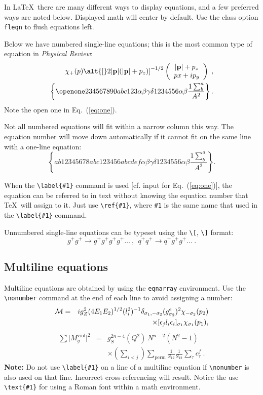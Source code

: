 \documentclass[%
 reprint,
 amsmath,amssymb,
 aps,
]{revtex4-2}
\begin{document}
In \LaTeX\ there are many different ways to display equations, and a
few preferred ways are noted below. Displayed math will center by
default. Use the class option \verb+fleqn+ to flush equations left.

Below we have numbered single-line equations; this is the most common
type of equation in \textit{Physical Review}:
\begin{eqnarray}
\chi_+(p)\alt{\bf [}2|{\bf p}|(|{\bf p}|+p_z){\bf ]}^{-1/2}
\left(
\begin{array}{c}
|{\bf p}|+p_z\\
px+ip_y
\end{array}\right)\;,
\\
\left\{%
 \openone234567890abc123\alpha\beta\gamma\delta1234556\alpha\beta
 \frac{1\sum^{a}_{b}}{A^2}%
\right\}%
\label{eq:one}.
\end{eqnarray}
Note the open one in Eq.~(\ref{eq:one}).

Not all numbered equations will fit within a narrow column this
way. The equation number will move down automatically if it cannot fit
on the same line with a one-line equation:
\begin{equation}
\left\{
 ab12345678abc123456abcdef\alpha\beta\gamma\delta1234556\alpha\beta
 \frac{1\sum^{a}_{b}}{A^2}%
\right\}.
\end{equation}

When the \verb+\label{#1}+ command is used [cf. input for
Eq.~(\ref{eq:one})], the equation can be referred to in text without
knowing the equation number that \TeX\ will assign to it. Just
use \verb+\ref{#1}+, where \verb+#1+ is the same name that used in
the \verb+\label{#1}+ command.

Unnumbered single-line equations can be typeset
using the \verb+\[+, \verb+\]+ format:
\[g^+g^+ \rightarrow g^+g^+g^+g^+ \dots ~,~~q^+q^+\rightarrow
q^+g^+g^+ \dots ~. \]


\subsection{Multiline equations}

Multiline equations are obtained by using the \verb+eqnarray+
environment.  Use the \verb+\nonumber+ command at the end of each line
to avoid assigning a number:
\begin{eqnarray}
{\cal M}=&&ig_Z^2(4E_1E_2)^{1/2}(l_i^2)^{-1}
\delta_{\sigma_1,-\sigma_2}
(g_{\sigma_2}^e)^2\chi_{-\sigma_2}(p_2)\nonumber\\
&&\times
[\epsilon_jl_i\epsilon_i]_{\sigma_1}\chi_{\sigma_1}(p_1),
\end{eqnarray}
\begin{eqnarray}
\sum \vert M^{\text{viol}}_g \vert ^2&=&g^{2n-4}_S(Q^2)~N^{n-2}
        (N^2-1)\nonumber \\
 & &\times \left( \sum_{i<j}\right)
  \sum_{\text{perm}}
 \frac{1}{S_{12}}
 \frac{1}{S_{12}}
 \sum_\tau c^f_\tau~.
\end{eqnarray}
\textbf{Note:} Do not use \verb+\label{#1}+ on a line of a multiline
equation if \verb+\nonumber+ is also used on that line. Incorrect
cross-referencing will result. Notice the use \verb+\text{#1}+ for
using a Roman font within a math environment.
\end{document}
